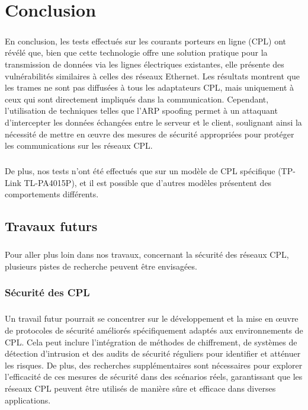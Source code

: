 \documentclass[a4paper,twocolumn]{report}
\begin{document}
\chapter{Conclusion}

\paragraph{}En conclusion, les tests effectués sur les courants porteurs
en ligne (CPL) ont révélé que, bien que cette technologie offre une solution
pratique pour la transmission de données via les lignes électriques existantes,
elle présente des vulnérabilités similaires à celles des réseaux Ethernet.
Les résultats montrent que les trames ne sont pas diffusées à tous les adaptateurs CPL,
mais uniquement à ceux qui sont directement impliqués dans la communication. Cependant,
l'utilisation de techniques telles que l'ARP spoofing permet à un attaquant d'intercepter
les données échangées entre le serveur et le client, soulignant ainsi la nécessité de
mettre en œuvre des mesures de sécurité appropriées pour protéger les communications sur les réseaux CPL.
\paragraph{}De plus, nos tests n'ont été effectués que sur un modèle de CPL spécifique
(TP-Link TL-PA4015P), et il est possible que d'autres modèles présentent des comportements différents.

\section{Travaux futurs}
\paragraph{}Pour aller plus loin dans nos travaux, concernant la sécurité des réseaux CPL, plusieurs pistes de recherche peuvent être envisagées.
\subsection{Sécurité des CPL}
\paragraph{}Un travail futur pourrait se concentrer sur le développement et la mise en œuvre
de protocoles de sécurité améliorés spécifiquement adaptés aux environnements de CPL.
Cela peut inclure l'intégration de méthodes de chiffrement, de systèmes de détection
d'intrusion et des audits de sécurité réguliers pour identifier et atténuer les risques.
De plus, des recherches supplémentaires sont nécessaires pour explorer l'efficacité de
ces mesures de sécurité dans des scénarios réels, garantissant que les réseaux CPL
peuvent être utilisés de manière sûre et efficace dans diverses applications.
\end{document}
